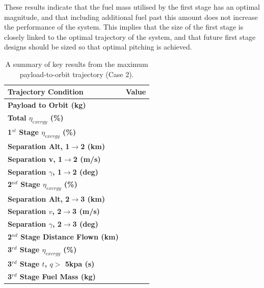 These results indicate that the fuel mass utilised by the first stage has an optimal magnitude, and that including additional fuel past this amount does not increase the performance of the system. This implies that the size of the first stage is closely linked to the optimal trajectory of the system, and that future first stage designs should be sized so that optimal pitching is achieved. 

\begin{table}[ht]%
	\centering
\begin{tabular}{l c } 
	\hline \textbf{Trajectory Condition}
	& Value
	\\
	\hline \textbf{Payload to Orbit (kg)}
	& \textbf{\PayloadToOrbitStandardNoReturn}
	\\
	\textbf{Total $\eta_{exergy}$ (\%)}
	& \textbf{\totalExergyEffStandardNoReturn}
	\\
	\hline 
	\textbf{1$^{st}$ Stage $\eta_{exergy}$ (\%)}
	& \textbf{\firstExergyEffStandardNoReturn}
	\\

	\textbf{Separation Alt, 1$\rightarrow$2 (km)}
	& \firstsecondSeparationAltStandardNoReturn
	\\
	\textbf{Separation v, 1$\rightarrow$2 (m/s)}
	& \firstsecondSeparationvStandardNoReturn
	\\
	\textbf{Separation $\gamma$, 1$\rightarrow$2 (deg)}
	& \firstsecondSeparationgammaStandardNoReturn
	\\
	\hline 
	\textbf{2$^{nd}$ Stage $\eta_{exergy}$ (\%)}
	& \textbf{\secondExergyEffStandardNoReturn}
	\\

	\textbf{Separation Alt, 2$\rightarrow$3 (km)}
	& \secondthirdSeparationAltStandardNoReturn
	\\
	\textbf{Separation $v$, 2$\rightarrow$3 (m/s)}
	& \secondthirdSeparationvStandardNoReturn
	\\
	\textbf{Separation $\gamma$, 2$\rightarrow$3 (deg)}
	& \secondthirdSeparationgammaStandardNoReturn
	\\
	\textbf{2$^{nd}$ Stage Distance Flown (km)}
	& \SecondDistStandardNoReturn
	\\
	\hline 
	\textbf{3$^{rd}$ Stage $\eta_{exergy}$ (\%)}
	& \textbf{\thirddExergyEffStandardNoReturn}
	\\

	\textbf{3$^{rd}$ Stage $t$, $q >$ 5kpa (s)}
	& \thirdqOverFiveStandardNoReturn
	\\
	\textbf{3$^{rd}$ Stage Fuel Mass (kg)}
	& \thirdmFuelStandardNoReturn
	\\
	\hline 
\end{tabular} 
	\caption{A summary of key results from the maximum payload-to-orbit trajectory (Case 2).}
	\label{tab:summaryStandardNoReturn}
\end{table}







